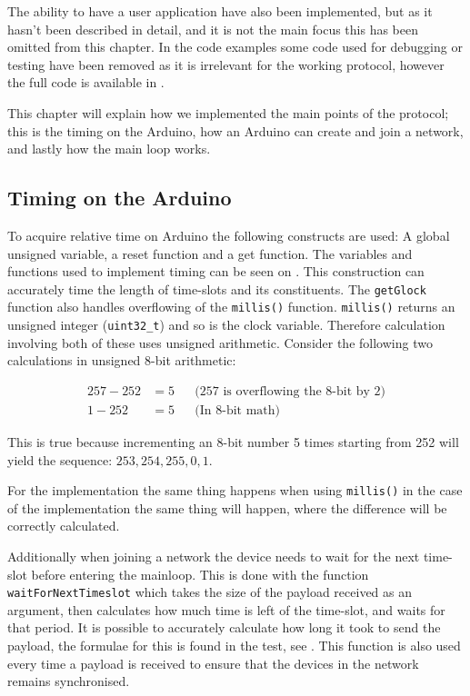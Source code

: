 \noindent
The ability to have a user application have also been implemented, but as it hasn't been described in detail, and it is not the main focus this has been omitted from this chapter.
In the code examples some code used for debugging or testing have been removed as it is irrelevant for the working protocol, however the full code is available in . 

This chapter will explain how we implemented the main points of the protocol; this is the timing on the Arduino, how an Arduino can create and join a network, and lastly how the main loop works. 

\subsection{Timing on the Arduino}
To acquire relative time on Arduino the following constructs are used: A global unsigned variable, a reset function and a get function.
The variables and functions used to implement timing can be seen on .
This construction can accurately time the length of time-slots and its constituents. 
The \texttt{getGlock} function also handles overflowing of the \texttt{millis()} function. 
\texttt{millis()} returns an unsigned integer (\texttt{uint32\_t}) and so is the clock variable.
Therefore calculation involving both of these uses unsigned arithmetic.
Consider the following two calculations in unsigned 8-bit arithmetic:

\begin{align*}
257 - 252   &= 5 && \text{(257 is overflowing the 8-bit by 2)} \\
1 - 252     &= 5 && \text{(In 8-bit math)}
\end{align*}

\noindent
This is true because incrementing an 8-bit number 5 times starting from 252 will yield the sequence: $253, 254, 255, 0, 1$. 

For the implementation the same thing happens when using \texttt{millis()} in the case of the implementation the same thing will happen, where the difference will be correctly calculated.

Additionally when joining a network the device needs to wait for the next time-slot before entering the mainloop. 
This is done with the function \texttt{waitForNextTimeslot} which takes the size of the payload received as an argument, then calculates how much time is left of the time-slot, and waits for that period. 
It is possible to accurately calculate how long it took to send the payload, the formulae for this is found in the test, see .
This function is also used every time a payload is received to ensure that the devices in the network remains synchronised. 

